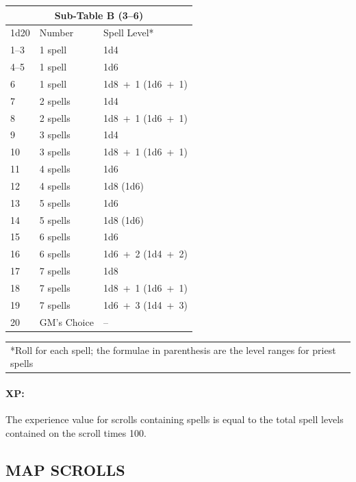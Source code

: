 \begin{multicols}{2}
\noindent
\begin{tabular}{|p{}|p{}|p{}|}
\multicolumn{3}{c}{Sub-Table B (3--6)} \\
\hline
1d20	& Number	& Spell Level* \\
\hline\hline
\rowcolor[gray]{.9}1--3	& 1 spell	& 1d4 \\
4--5	& 1 spell	& 1d6 \\
\rowcolor[gray]{.9}6	& 1 spell	& 1d8~+~1 (1d6~+~1) \\
7	& 2 spells	& 1d4 \\
\rowcolor[gray]{.9}8	& 2 spells	& 1d8~+~1 (1d6~+~1) \\
9	& 3 spells	& 1d4 \\
\rowcolor[gray]{.9}10	& 3 spells	& 1d8~+~1 (1d6~+~1) \\
11	& 4 spells	& 1d6 \\
\rowcolor[gray]{.9}12	& 4 spells	& 1d8 (1d6) \\
13	& 5 spells	& 1d6 \\
\rowcolor[gray]{.9}14	& 5 spells	& 1d8 (1d6) \\
15	& 6 spells	& 1d6 \\
\rowcolor[gray]{.9}16	& 6 spells	& 1d6~+~2 (1d4~+~2) \\
17	& 7 spells	& 1d8 \\
\rowcolor[gray]{.9}18	& 7 spells	& 1d8~+~1 (1d6~+~1) \\
19	& 7 spells	& 1d6~+~3 (1d4~+~3) \\
\rowcolor[gray]{.9}20	& GM's Choice	& -- \\
\hline
\end{tabular}
\noindent\begin{tabular}{p{}}
*Roll for each spell; the formulae in parenthesis are the level ranges for priest spells \\
\end{tabular}\vspace{.5em}

\paragraph{XP:} The experience value for scrolls containing spells is equal to the total spell levels contained on the scroll times 100.

\subsection{MAP SCROLLS}


\end{multicols}
